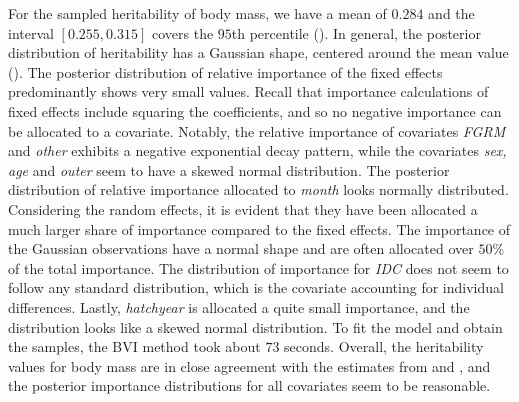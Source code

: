 \noindent For the sampled heritability of body mass, we have a mean of $0.284$ and the interval $[0.255, 0.315]$ covers the $95$th percentile (). In general, the posterior distribution of heritability has a Gaussian shape, centered around the mean value (). The posterior distribution of relative importance of the fixed effects predominantly shows very small values. Recall that importance calculations of fixed effects include squaring the coefficients, and so no negative importance can be allocated to a covariate. Notably, the relative importance of covariates \textit{FGRM} and \textit{other} exhibits a negative exponential decay pattern, while the covariates \textit{sex, age} and \textit{outer} seem to have a skewed normal distribution. The posterior distribution of relative importance allocated to \textit{month} looks normally distributed. Considering the random effects, it is evident that they have been allocated a much larger share of importance compared to the fixed effects. The importance of the Gaussian observations have a normal shape and are often allocated over $50\%$ of the total importance. The distribution of importance for \textit{IDC} does not seem to follow any standard distribution, which is the covariate accounting for individual differences. Lastly, \textit{hatchyear} is allocated a quite small importance, and the distribution looks like a skewed normal distribution. To fit the model and obtain the samples, the BVI method took about $73$ seconds. Overall, the heritability values for body mass are in close agreement with the estimates from \citet{Silva2017} and \citet{Muff2019Genetic}, and the posterior importance distributions for all covariates seem to be reasonable. 
